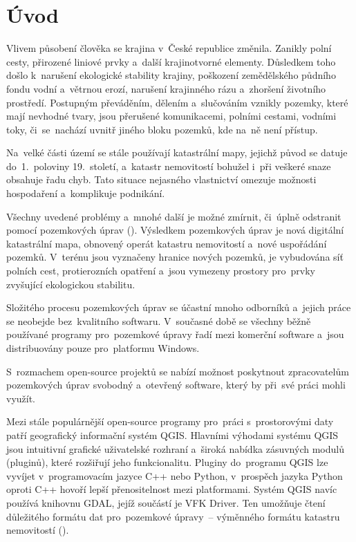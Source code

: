 \chapter{Úvod}
\label{1-uvod}

Vlivem působení člověka se krajina v~České republice změnila. Zanikly
polní cesty, přirozené liniové prvky a~další krajinotvorné
elementy. Důsledkem toho došlo k~naru\-šení ekologické stability
krajiny, poškození zemědělského půdního fondu vodní a~vě\-trnou erozí,
narušení krajinného rázu a~zhoršení životního prostředí. Postupným
převáděním, dělením a~slučováním vznikly pozemky, které mají nevhodné
tvary, jsou přerušené komunikacemi, polními cestami, vodními toky,
či~se~nachází uvnitř jiného bloku pozemků, kde na~ně není přístup.

Na~velké části území se stále používají katastrální mapy, jejichž
původ se datuje do~1.~poloviny 19.~století, a~katastr nemovitostí
bohužel i~při veškeré snaze obsahuje řadu chyb. Tato situace nejasného
vlastnictví omezuje možnosti hospodaření a~komplikuje podnikání.

Všechny uvedené problémy a~mnohé další je možné zmírnit, či~úplně
odstranit pomocí pozemkových úprav (). Výsledkem pozemkových
úprav je nová digi\-tální katastrální mapa, obnovený operát katastru
nemovitostí a~nové uspořádání pozemků. V~terénu jsou vyznačeny hranice
nových pozemků, je vybudována síť polních cest, protierozních opatření
a~jsou vymezeny prostory pro~prvky zvyšující ekologickou stabilitu.

Složitého procesu pozemkových úprav se účastní mnoho odborníků
a~jejich práce se neobejde bez~kvalitního softwaru. V~současné době se
všechny běžně používané programy pro~pozemkové úpravy řadí mezi
komerční software a~jsou distribuovány pouze pro~platformu Windows.

S~rozmachem open-source projektů se nabízí možnost poskytnout
zpracovatelům pozemkových úprav svobodný a~otevřený software, který by
při~své práci mohli využít.

Mezi stále populárnější open-source programy pro~práci s~prostorovými
daty patří geografický informační systém QGIS. Hlavními výhodami
systému QGIS jsou intuitivní grafické uživatelské rozhraní a~široká
nabídka zásuvných modulů (pluginů), které rozšiřují jeho
funkcionalitu. Pluginy do~programu QGIS lze vyvíjet v~programovacím
jazyce C++ nebo Python, v~prospěch jazyka Python oproti C++ ho\-voří
lepší přenositelnost mezi platformami. Systém QGIS navíc používá
knihovnu GDAL, jejíž součástí je VFK Driver. Ten umožňuje čtení
důležitého formátu dat pro~pozemkové úpravy~– výměnného formátu
katastru nemovitostí ().


